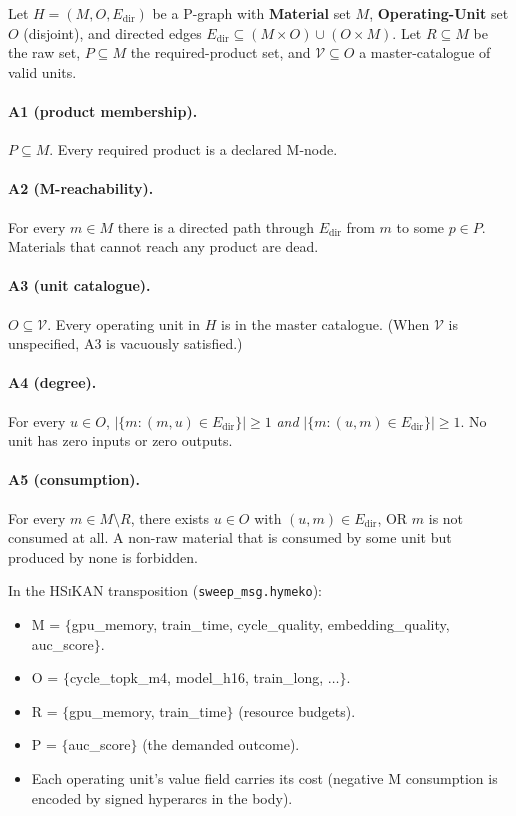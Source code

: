 \documentclass[11pt,a4paper]{article}
\newcommand{\HSiKAN}{\textsc{HSiKAN}}
\newcommand{\code}[1]{\texttt{\small #1}}
\begin{document}
Let $H = (M, O, E_{\mathrm{dir}})$ be a P-graph with
\textbf{Material} set $M$, \textbf{Operating-Unit} set $O$ (disjoint),
and directed edges $E_{\mathrm{dir}} \subseteq (M \times O)
\cup (O \times M)$. Let $R \subseteq M$ be the raw set, $P \subseteq M$
the required-product set, and $\mathcal{V} \subseteq O$ a
master-catalogue of valid units.

\paragraph{A1 (product membership).}
$P \subseteq M$. Every required product is a declared M-node.

\paragraph{A2 (M-reachability).}
For every $m \in M$ there is a directed path through
$E_{\mathrm{dir}}$ from $m$ to some $p \in P$. Materials that cannot
reach any product are dead.

\paragraph{A3 (unit catalogue).}
$O \subseteq \mathcal{V}$. Every operating unit in $H$ is in the
master catalogue. (When $\mathcal{V}$ is unspecified, A3 is
vacuously satisfied.)

\paragraph{A4 (degree).}
For every $u \in O$, $|\{m : (m, u) \in E_{\mathrm{dir}}\}| \geq 1$
\emph{and} $|\{m : (u, m) \in E_{\mathrm{dir}}\}| \geq 1$. No unit
has zero inputs or zero outputs.

\paragraph{A5 (consumption).}
For every $m \in M \setminus R$, there exists $u \in O$ with
$(u, m) \in E_{\mathrm{dir}}$, OR $m$ is not consumed at all. A
non-raw material that is consumed by some unit but produced by
none is forbidden.

In the \HSiKAN{} transposition (\code{sweep\_msg.hymeko}):
\begin{itemize}
\item M = $\{$gpu\_memory, train\_time, cycle\_quality,
      embedding\_quality, auc\_score$\}$.
\item O = $\{$cycle\_topk\_m4, model\_h16, train\_long, $\dots\}$.
\item R = $\{$gpu\_memory, train\_time$\}$ (resource budgets).
\item P = $\{$auc\_score$\}$ (the demanded outcome).
\item Each operating unit's value field carries its cost (negative
      M consumption is encoded by signed hyperarcs in the body).
\end{itemize}
\end{document}

